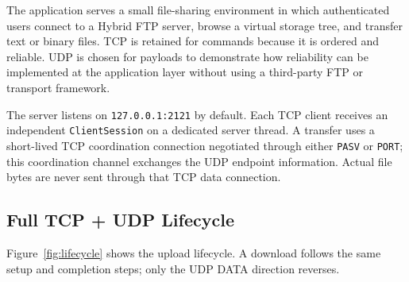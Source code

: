 \documentclass[11pt,a4paper]{article}
\newcommand{\code}[1]{\texttt{#1}}
\begin{document}
The application serves a small file-sharing environment in which authenticated users connect to a Hybrid FTP server, browse a virtual storage tree, and transfer text or binary files. TCP is retained for commands because it is ordered and reliable. UDP is chosen for payloads to demonstrate how reliability can be implemented at the application layer without using a third-party FTP or transport framework.

The server listens on \code{127.0.0.1:2121} by default. Each TCP client receives an independent \code{ClientSession} on a dedicated server thread. A transfer uses a short-lived TCP coordination connection negotiated through either \code{PASV} or \code{PORT}; this coordination channel exchanges the UDP endpoint information. Actual file bytes are never sent through that TCP data connection.

\subsection{Full TCP + UDP Lifecycle}

Figure~\ref{fig:lifecycle} shows the upload lifecycle. A download follows the same setup and completion steps; only the UDP DATA direction reverses.
\end{document}
